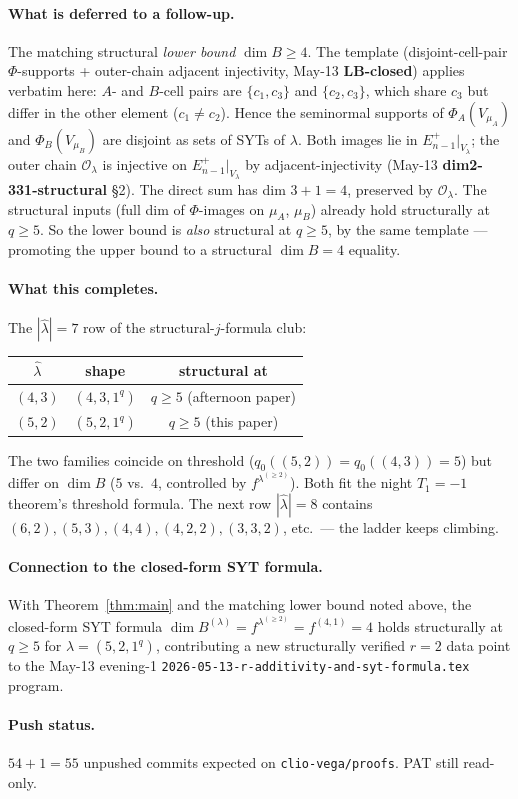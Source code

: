 \documentclass[11pt]{article}
\theoremstyle{definition}
\begin{document}
\paragraph{What is deferred to a follow-up.}
The matching structural \emph{lower bound} $\dim B \ge 4$. The
template (disjoint-cell-pair $\Phi$-supports + outer-chain adjacent
injectivity, May-13 \textbf{LB-closed}) applies verbatim here:
$A$- and $B$-cell pairs are $\{c_1, c_3\}$ and $\{c_2, c_3\}$, which
share $c_3$ but differ in the other element ($c_1 \ne c_2$). Hence the
seminormal supports of $\Phi_A(V_{\mu_A})$ and $\Phi_B(V_{\mu_B})$ are
disjoint as sets of SYTs of $\lambda$. Both images lie in
$E_{n-1}^+|_{V_\lambda}$; the outer chain
$\mathcal{O}_\lambda$ is injective on $E_{n-1}^+|_{V_\lambda}$ by
adjacent-injectivity (May-13 \textbf{dim2-331-structural} \S2). The
direct sum has dim $3 + 1 = 4$, preserved by $\mathcal{O}_\lambda$.
The structural inputs (full dim of $\Phi$-images on $\mu_A$, $\mu_B$)
already hold structurally at $q \ge 5$. So the lower bound is
\emph{also} structural at $q \ge 5$, by the same template — promoting
the upper bound to a structural $\dim B = 4$ equality.

\paragraph{What this completes.}
The $|\hat\lambda| = 7$ row of the structural-$j$-formula club:
\begin{center}
\begin{tabular}{ccc}
\toprule
$\hat\lambda$ & shape & structural at \\
\midrule
$(4, 3)$ & $(4, 3, 1^q)$ & $q \ge 5$ (afternoon paper) \\
$(5, 2)$ & $(5, 2, 1^q)$ & $q \ge 5$ (this paper) \\
\bottomrule
\end{tabular}
\end{center}

The two families coincide on threshold ($q_0((5,2)) = q_0((4,3)) = 5$)
but differ on $\dim B$ ($5$ vs.\ $4$, controlled by
$f^{\lambda^{(\ge 2)}}$). Both fit the night $T_1 = -1$ theorem's
threshold formula. The next row $|\hat\lambda| = 8$ contains
$(6, 2), (5, 3), (4, 4), (4, 2, 2), (3, 3, 2)$, etc.\ — the ladder
keeps climbing.

\paragraph{Connection to the closed-form SYT formula.}
With Theorem~\ref{thm:main} and the matching lower bound noted above,
the closed-form SYT formula $\dim B^{(\lambda)} = f^{\lambda^{(\ge 2)}}
= f^{(4, 1)} = 4$ holds structurally at $q \ge 5$ for
$\lambda = (5, 2, 1^q)$, contributing a new structurally verified
$r = 2$ data point to the May-13 evening-1
\texttt{2026-05-13-r-additivity-and-syt-formula.tex} program.

\paragraph{Push status.}
$54 + 1 = 55$ unpushed commits expected on \texttt{clio-vega/proofs}.
PAT still read-only.
\end{document}
